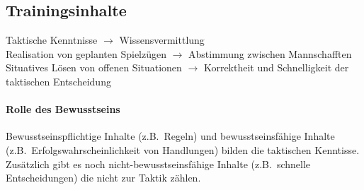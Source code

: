 \subsection{Trainingsinhalte}
Taktische Kenntnisse $\rightarrow$ Wissensvermittlung\\
Realisation von geplanten Spielzügen $\rightarrow$ Abstimmung zwischen Mannschafften\\
Situatives Lösen von offenen Situationen $\rightarrow$ Korrektheit und Schnelligkeit der taktischen Entscheidung
\paragraph{Rolle des Bewusstseins} Bewusstseinspflichtige Inhalte (z.B.\ Regeln) und bewusstseinsfähige Inhalte (z.B.\ Erfolgswahrscheinlichkeit von Handlungen) bilden die taktischen Kenntisse. Zusätzlich gibt es noch nicht-bewusstseinsfähige Inhalte (z.B.\ schnelle Entscheidungen) die nicht zur Taktik zählen.
